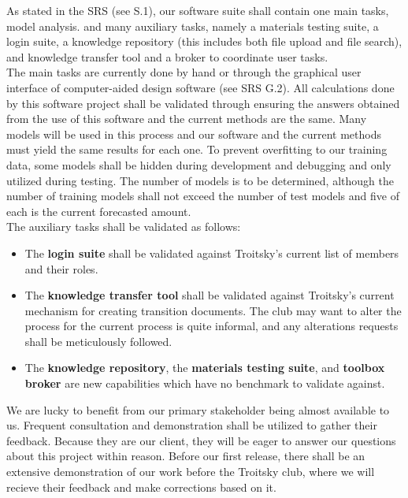 \documentclass[12pt, titlepage]{article}
\begin{document}
As stated in the SRS (see S.1), our software suite shall contain one main tasks, model analysis. 
and many auxiliary tasks, namely a materials testing suite, a login suite, a knowledge repository (this includes both file upload and file search), and knowledge transfer tool and a broker to
coordinate user tasks. \\

The main tasks are currently done by hand or through the graphical user interface of computer-aided design software  (see SRS G.2).
All calculations done by this software project shall be validated through ensuring the answers obtained from the use of this software
and the current methods are the same. Many models will be used in this process and our software and the current methods must yield the same
results for each one. To prevent overfitting to our training data, some models shall be hidden during development and debugging and only
utilized during testing. The number of models is to be determined, although the number of training models shall not exceed the number of test models
and five of each is the current forecasted amount. \\

The auxiliary tasks shall be validated as follows:

\begin{itemize}
  \item The \textbf{login suite} shall be validated against Troitsky's current list of members and their roles.
  \item The \textbf{knowledge transfer tool} shall be validated against Troitsky's current mechanism for creating transition documents. The club may want to alter the process for the current process is quite informal, and any alterations requests shall be meticulously followed.
  \item The \textbf{knowledge repository}, the \textbf{materials testing suite}, and \textbf{toolbox broker} are new capabilities which have no benchmark to validate against.
\end{itemize}

We are lucky to benefit from our primary stakeholder being almost available to us. Frequent consultation and demonstration
shall be utilized to gather their feedback. Because they are our client, they will be eager to answer our questions about this
project within reason. Before our first release, there shall be an extensive demonstration of our work before the Troitsky club,
where we will recieve their feedback and make corrections based on it.
\end{document}
